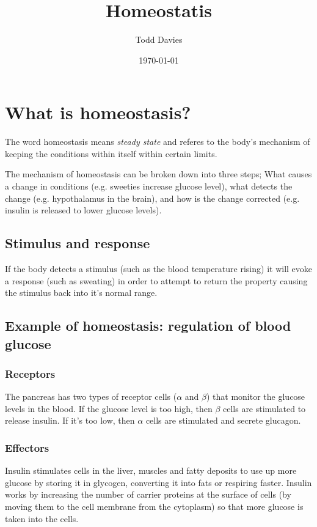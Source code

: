 \documentclass{article}
\title{Homeostatis}
\author{Todd Davies}
\date{\today}
\begin{document}
\lhead{\today}

\maketitle

\section*{What is homeostasis?}
\thispagestyle{empty}

The word homeostasis means {\it steady state} and referes to the body's
mechanism of keeping the conditions within itself within certain limits.

The mechanism of homeostasis can be broken down into three steps; What causes a
change in conditions (e.g. sweeties increase glucose level), what detects the
change (e.g. hypothalamus in the brain), and how is the change corrected (e.g.
insulin is released to lower glucose levels).

\subsection*{Stimulus and response}

If the body detects a stimulus (such as the blood temperature rising) it will
evoke a response (such as sweating) in order to attempt to return the property
causing the stimulus back into it's normal range.

\subsection*{Example of homeostasis: regulation of blood glucose}

\subsubsection*{Receptors}

The pancreas has two types of receptor cells ($\alpha$ and $\beta$) that monitor
the glucose levels in the blood. If the glucose level is too high, then $\beta$
cells are stimulated to release insulin. If it's too low, then $\alpha$ cells
are stimulated and secrete glucagon.

\subsubsection*{Effectors}

Insulin stimulates cells in the liver, muscles and fatty deposits to use up more
glucose by storing it in glycogen, converting it into fats or respiring faster.
Insulin works by increasing the number of carrier proteins at the surface of
cells (by moving them to the cell membrane from the cytoplasm) so that more
glucose is taken into the cells.
\end{document}

